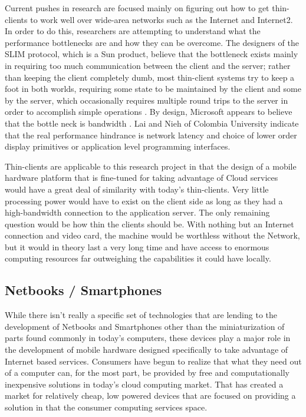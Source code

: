 Current pushes in research are focused mainly on figuring out how to get
thin-clients to work well over wide-area networks such as the Internet and
Internet2.  In order to do this, researchers are attempting to understand what
the performance bottlenecks are and how they can be overcome.  The designers of
the SLIM protocol, which is a Sun product, believe that the bottleneck exists
mainly in requiring too much communication between the client and the server;
rather than keeping the client completely dumb, most thin-client systems try to
keep a foot in both worlds, requiring some state to be maintained by the client
and some by the server, which occasionally requires multiple round trips to the
server in order to accomplish simple operations \citep{schmidt1999}.  By design,
Microsoft appears to believe that the bottle neck is bandwidth \citep{lai2002}.
Lai and Nieh of Colombia University indicate that the real performance hindrance
is network latency and choice of lower order display primitives or application
level programming interfaces.

Thin-clients are applicable to this research project in that the design of a
mobile hardware platform that is fine-tuned for taking advantage of Cloud
services would have a great deal of similarity with today's thin-clients.  Very
little processing power would have to exist on the client side as long as they
had a high-bandwidth connection to the application server.  The only remaining
question would be how thin the clients should be.  With nothing but an Internet
connection and video card, the machine would be worthless without the Network,
but it would in theory last a very long time and have access to enormous
computing resources far outweighing the capabilities it could have locally.

\subsection{Netbooks / Smartphones}

While there isn't really a specific set of technologies that are lending to the
development of Netbooks and Smartphones other than the miniaturization of parts
found commonly in today's computers, these devices play a major role in the
development of mobile hardware designed specifically to take advantage of
Internet based services.  Consumers have begun to realize that what they need
out of a computer can, for the most part, be provided by free and
computationally inexpensive solutions in today's cloud computing market.  That
has created a market for relatively cheap, low powered devices that are focused
on providing a solution in that the consumer computing services space.

